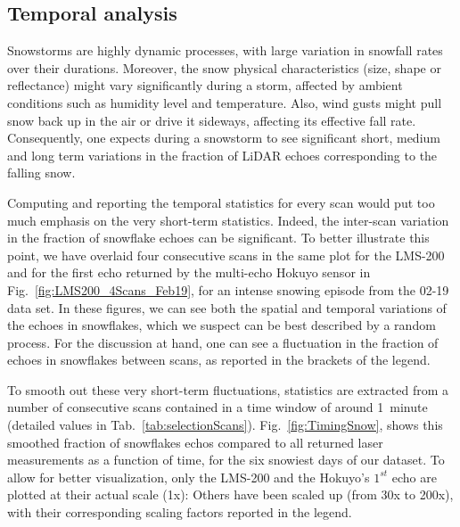 
\subsection{Temporal analysis}
Snowstorms are highly dynamic processes, with large variation in snowfall rates over their durations. Moreover, the snow physical characteristics (size, shape or reflectance) might vary significantly during a storm, affected by ambient conditions such as humidity level and temperature. Also, wind gusts might pull snow back up in the air or drive it sideways, affecting its effective fall rate. Consequently, one expects during a snowstorm to see significant short, medium and long term variations in the fraction of LiDAR echoes corresponding to the falling snow. 

Computing and reporting the temporal statistics for every scan would put too much emphasis on the very short-term statistics. Indeed, the inter-scan variation in the fraction of snowflake echoes can be significant. To better illustrate this point, we have overlaid four consecutive scans in the same plot for the LMS-200 and for the first echo returned by the multi-echo Hokuyo sensor in Fig.~\ref{fig:LMS200_4Scans_Feb19}, for an intense snowing episode from the 02-19 data set. In these figures, we can see both the spatial and temporal variations of the echoes in snowflakes, which we suspect can be best described by a random process. For the discussion at hand, one can see a fluctuation in the fraction of echoes in snowflakes between scans, as reported in the brackets of the legend. 

To smooth out these very short-term fluctuations, statistics are extracted from a number of consecutive scans contained in a time window of around 1~minute (detailed values in Tab.~\ref{tab:selectionScans}). Fig.~\ref{fig:TimingSnow}, shows this smoothed fraction of snowflakes echos compared to all returned laser measurements as a function of time, for the six snowiest days of our dataset. To allow for better visualization, only the LMS-200 and the Hokuyo's $1^{st}$ echo are plotted at their actual scale (1x): Others have been scaled up (from 30x to 200x), with their corresponding scaling factors reported in the legend. 

